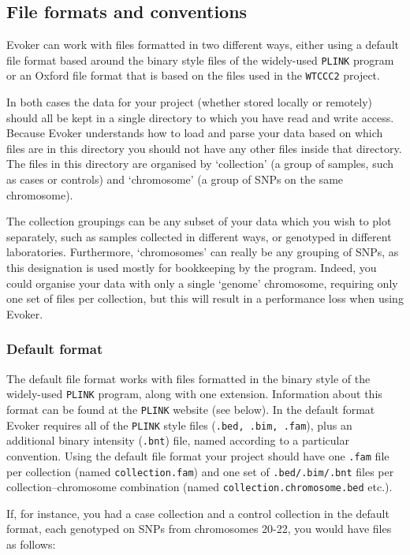 \documentclass{article}
\begin{document}
\subsection{File formats and conventions}

Evoker can work with files formatted in two different ways, either using a default file format based around the binary style files of the widely-used \texttt{PLINK} program or an Oxford file format that is based on the files used in the \texttt{WTCCC2} project. 

In both cases the data for your project (whether stored locally or remotely) should all be kept in a single directory to which you have read and write access. Because Evoker understands how to load and parse your data based on which files are in this directory you should not have any other files inside that directory. The files in this directory are organised by `collection' (a group of samples, such as cases or controls) and `chromosome' (a group of SNPs on the same chromosome).

The collection groupings can be any subset of your data which you wish to plot separately, such as samples collected in different ways, or genotyped in different laboratories. Furthermore, `chromosomes' can really be any grouping of SNPs, as this designation is used mostly for bookkeeping by the program. Indeed, you could organise your data with only a single `genome' chromosome, requiring only one set of files per collection, but this will result in a performance loss when using Evoker.

\subsubsection{Default format}
The default file format works with files formatted in the binary style of the widely-used \texttt{PLINK} program, along with one extension. Information about this format can be found at the \texttt{PLINK} website (see below). In the default format Evoker requires all of the \texttt{PLINK} style files (\texttt{.bed, .bim, .fam}), plus an additional binary intensity (\texttt{.bnt}) file, named according to a particular convention. Using the default file format your project should have one \texttt{.fam} file per collection (named \texttt{collection.fam}) and one set of \texttt{.bed/.bim/.bnt} files per collection--chromosome combination (named \texttt{collection.chromosome.bed} etc.).

If, for instance, you had a case collection and a control collection in the default format, each genotyped on SNPs from chromosomes 20-22, you would have files as follows:
\end{document}
